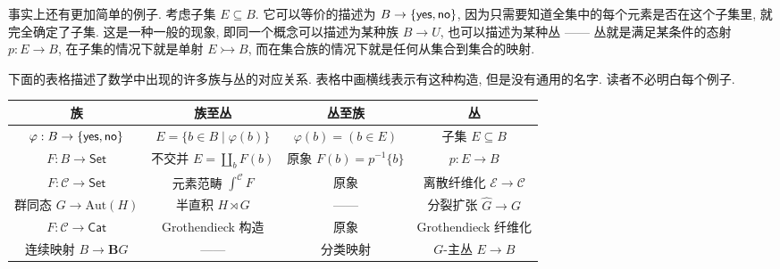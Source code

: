 \begin{center}
\end{center}

事实上还有更加简单的例子. 考虑子集 \(E \subseteq B\).
它可以等价的描述为 \(B \to \{\textnormal{\textsf{yes}}, \textnormal{\textsf{no}}\}\),
因为只需要知道全集中的每个元素是否在这个子集里, 就完全确定了子集.
这是一种一般的现象, 即同一个概念可以描述为某种族 \(B \to U\),
也可以描述为某种丛 ------ 丛就是满足某条件的态射 \(p : E \to B\),
在子集的情况下就是单射 \(E \rightarrowtail B\),
而在集合族的情况下就是任何从集合到集合的映射.

下面的表格描述了数学中出现的许多族与丛的对应关系.
表格中画横线表示有这种构造, 但是没有通用的名字.
读者不必明白每个例子.

\begin{center}
\begin{tabular}{c c c c}\hline
族 & 族至丛 & 丛至族 & 丛\\\hline
\(\varphi : B \to \{\textnormal{\textsf{yes}}, \textnormal{\textsf{no}}\}\) &
\(E = \{b \in B \mid \varphi(b)\}\) &
\(\varphi(b) = (b \in E)\)&
子集 \(E \subseteq B\) \\
\(F : B \to \mathsf{Set}\) &
\!\!不交并 \(E = \coprod_{b} F(b)\)\!\! &
原象 \(F(b) = p^{-1}\{b\}\) &
\(p : E \to B\)\\
\(F : \mathcal C \to \mathsf{Set}\) &
元素范畴 \(\int^{\mathcal C}F\) &
原象 &
离散纤维化 \(\mathcal E \to \mathcal C\)\\
\!群同态 \(G \to \mathrm{Aut}(H)\)\!&
半直积 \(H \rtimes G\) &
------ &
分裂扩张 \(\hat G \to G\)\\
\(F : \mathcal C \to \mathsf{Cat}\) &
\!Grothendieck 构造\! &
原象 &
\!Grothendieck 纤维化\! \\
连续映射 \(B \to \mathbf{B}G\) &
------ &
分类映射 &
\(G\)-主丛 \(E \to B\)
\\\hline
\end{tabular}
\end{center}

